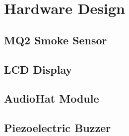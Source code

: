 \section{Hardware Design}

\subsection{MQ2 Smoke Sensor}

\subsection{LCD Display}

\subsection{AudioHat Module}

\subsection{Piezoelectric Buzzer}
